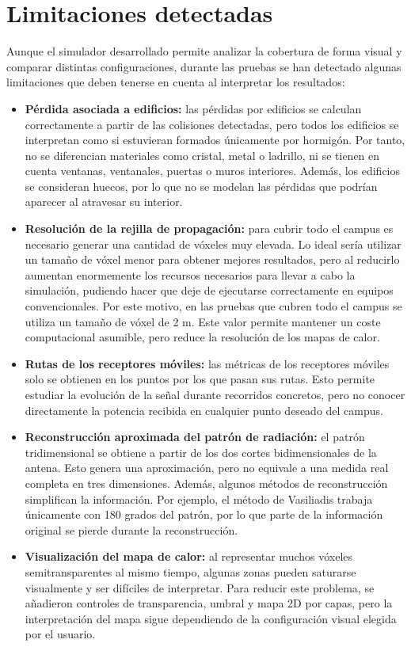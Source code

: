 \section{Limitaciones detectadas}

Aunque el simulador desarrollado permite analizar la cobertura de forma visual y comparar distintas configuraciones, durante las pruebas se han detectado algunas limitaciones que deben tenerse en cuenta al interpretar los resultados:

\begin{itemize}
   \item \textbf{Pérdida asociada a edificios:} las pérdidas por edificios se calculan correctamente a partir de las colisiones detectadas, pero todos los edificios se interpretan como si estuvieran formados únicamente por hormigón. Por tanto, no se diferencian materiales como cristal, metal o ladrillo, ni se tienen en cuenta ventanas, ventanales, puertas o muros interiores. Además, los edificios se consideran huecos, por lo que no se modelan las pérdidas que podrían aparecer al atravesar su interior.
    
    \item \textbf{Resolución de la rejilla de propagación:} para cubrir todo el campus es necesario generar una cantidad de vóxeles muy elevada. Lo ideal sería utilizar un tamaño de vóxel menor para obtener mejores resultados, pero al reducirlo aumentan enormemente los recursos necesarios para llevar a cabo la simulación, pudiendo hacer que deje de ejecutarse correctamente en equipos convencionales. Por este motivo, en las pruebas que cubren todo el campus se utiliza un tamaño de vóxel de 2 m. Este valor permite mantener un coste computacional asumible, pero reduce la resolución de los mapas de calor.

    \item \textbf{Rutas de los receptores móviles:} las métricas de los receptores móviles solo se obtienen en los puntos por los que pasan sus rutas. Esto permite estudiar la evolución de la señal durante recorridos concretos, pero no conocer directamente la potencia recibida en cualquier punto deseado del campus.

    \item \textbf{Reconstrucción aproximada del patrón de radiación:} el patrón tridimensional se obtiene a partir de los dos cortes bidimensionales de la antena. Esto genera una aproximación, pero no equivale a una medida real completa en tres dimensiones. Además, algunos métodos de reconstrucción simplifican la información. Por ejemplo, el método de Vasiliadis trabaja únicamente con 180 grados del patrón, por lo que parte de la información original se pierde durante la reconstrucción.

    \item \textbf{Visualización del mapa de calor:} al representar muchos vóxeles semitransparentes al mismo tiempo, algunas zonas pueden saturarse visualmente y ser difíciles de interpretar. Para reducir este problema, se añadieron controles de transparencia, umbral y mapa 2D por capas, pero la interpretación del mapa sigue dependiendo de la configuración visual elegida por el usuario.
\end{itemize}
